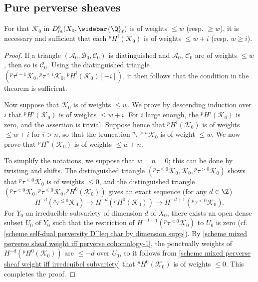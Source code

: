 \subsection{Pure perverse sheaves}
\begin{theorem}\label{scheme mixed complex weight iff perverse cohomology}
For that $\mathscr{K}_0$ in $D^b_m(X_0,\widebar{\Q}_\ell)$ is of weights $\leq w$ (resp. $\geq w$), it is necessary and sufficient that each ${^p\!H^i}(\mathscr{K}_0)$ is of weights $\leq w+i$ (resp. $w\geq i$).
\end{theorem}
\begin{proof}
If a triangle $(\mathscr{A}_0,\mathscr{B}_0,\mathscr{C}_0)$ is diatinguished and $\mathscr{A}_0$, $\mathscr{C}_0$ are of weights $\leq w$, then so is $\mathscr{C}_0$. Using the diatinguished triangle $({^p\!\tau^{i-1}\mathscr{K}_0},{^p\!\tau^{\leq i}\mathscr{K}_0},{^p\!H^i}(\mathscr{K}_0)[-i])$, it then follows that the condition in the theorem is sufficient.\par
Now suppose that $\mathscr{K}_0$ is of weights $\leq w$. We prove by descending induction over $i$ that ${^p\!H^i}(\mathscr{K}_0)$ is of weights $\leq w+i$. For $i$ large enough, the ${^p\!H^i}(\mathscr{K}_0)$ is zero, and the assertion is trivial. Suppose hence that ${^p\!H^i}(\mathscr{K}_0)$ is of weights $\leq w+i$ for $i>n$, so that the truncation ${^p\!\tau^{>n}\mathscr{K}_0}$ is of weight $\leq w$. We now prove that ${^p\!H^n}(\mathscr{K}_0)$ is of weights $\leq w+n$.\par
To simplify the notations, we suppose that $w=n=0$; this can be done by twisting and shifts. The distinguished triangle $({^p\!\tau^{\leq 0}\mathscr{K}_0},\mathscr{K}_0,{^p\!\tau^{>0}\mathscr{K}_0})$ shows that ${^p\!\tau^{\leq 0}\mathscr{K}_0}$ is of weights $\leq 0$, and the distinguished triangle $({^p\!\tau^{<0}\mathscr{K}_0},{^p\!\tau^{\leq 0}\mathscr{K}_0},{^p\!H^0}(\mathscr{K}_0))$ gives an exact sequence (for any $d\in\Z$)
\begin{equation}\label{scheme mixed perverse sheaf weight iff perverse cohomology-1}
H^{-d}({^p\!\tau^{\leq 0}\mathscr{K}_0})\to H^{-d}({^p\!H^0}(\mathscr{K}_0))\to H^{-d+1}({^p\!\tau^{<0}\mathscr{K}_0}).
\end{equation}
For $Y_0$ an irreducible subvariety of dimension $d$ of $X_0$, there exists an open dense subset $U_0$ of $Y_0$ such that the restriction of $H^{-d+1}({^p\!\tau^{<0}\mathscr{K}_0})$ to $U_0$ is zero (cf. \cref{scheme self-dual perversity D^leq char by dimension supp}). By \cref{scheme mixed perverse sheaf weight iff perverse cohomology-1}, the ponctually weights of $H^{-d}({^p\!H^0}(\mathscr{K}_0))$ are $\leq -d$ over $U_0$, so it follows from \cref{scheme mixed perverse sheaf weight iff irredcuibel subvariety} that ${^p\!H^0(\mathscr{K}_0)}$ is of weights $\leq 0$. This completes the proof.
\end{proof}

